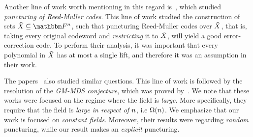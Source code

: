 Another line of work worth mentioning in this regard is~\cite{4558818, guruswami2017efficientlylistdecodablepuncturedreedmuller},
which studied \emph{puncturing of Reed-Muller codes}.
This line of work studied the construction of sets $\variety \subseteq \field$,
such that puncturing Reed-Muller codes over ${\tilde{X}}$, that is, taking every original codeword and \emph{restricting} it to ${\tilde{X}}$, will yield a good error-correction code.
To perform their analysis, it was important that every polynomial in ${\tilde{X}}$ has at most a single lift,
and therefore it was an assumption in their work.

The papers~\cite{brakensiek2024genericreedsolomoncodesachieve, alrabiah2024randomlypuncturedreedsolomoncodes, brakensiek2024generalizedgmmdspolynomialcodes}
also studied similar questions.
This line of work is followed by the resolution of the \emph{GM-MDS conjecture}, which was proved by~\cite{DBLP:journals/corr/abs-1803-02523, DBLP:journals/corr/abs-1803-03752}.
\newline
We note that these works
were focused on the regime where the field is \emph{large}.
More specifically,
they require that the field is \emph{large in respect of $n$}, i.e $\Omega(n)$.
We emphasize that our work is focused on \emph{constant fields}.
Moreover, their results were regarding \emph{random} puncturing, while our result makes an \emph{explicit} puncturing.

